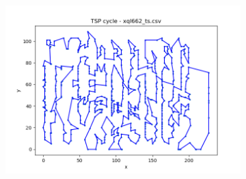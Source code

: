\documentclass[12pt]{article}
\begin{document}
\begin{figure}[htpb]
\begin{subfigure}[b]{0.475\textwidth}
                \includegraphics[width=\linewidth]{img/xql662_ts.png}
            \end{subfigure}
        \end{figure}
\end{document}

